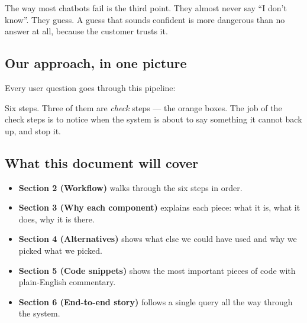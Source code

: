 \documentclass[11pt,a4paper]{article}
\begin{document}
The way most chatbots fail is the third point. They almost never say ``I don't know''. They guess. A guess that sounds confident is more dangerous than no answer at all, because the customer trusts it.

\subsection{Our approach, in one picture}

Every user question goes through this pipeline:

\begin{center}
\end{center}

Six steps. Three of them are \emph{check} steps --- the orange boxes. The job of the check steps is to notice when the system is about to say something it cannot back up, and stop it.

\subsection{What this document will cover}

\begin{itemize}[leftmargin=*, itemsep=2pt]
\item \textbf{Section 2 (Workflow)} walks through the six steps in order.
\item \textbf{Section 3 (Why each component)} explains each piece: what it is, what it does, why it is there.
\item \textbf{Section 4 (Alternatives)} shows what else we could have used and why we picked what we picked.
\item \textbf{Section 5 (Code snippets)} shows the most important pieces of code with plain-English commentary.
\item \textbf{Section 6 (End-to-end story)} follows a single query all the way through the system.
\end{itemize}
\end{document}
